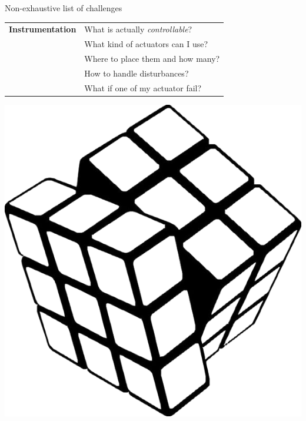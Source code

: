 \documentclass[aspectratio=169,compress,12pt,dvipsnames]{beamer}
\begin{document}
\begin{frame}[t, c]{Non-exhaustive list of challenges}
    \vfill
    \begin{minipage}{.68\textwidth}
        \centering
        \begin{tabular}{rl}
            \textbf{Instrumentation}    &   What is actually \emph{controllable}?   \\
                                        &   What kind of actuators can I use?       \\
                                        &   Where to place them and how many?       \\
                                        &   How to handle disturbances?             \\
                                        &   What if one of my actuator fail?
        \end{tabular}
    \end{minipage}%
    \hfill
    \begin{minipage}{.28\textwidth}
        \centering
        \includegraphics[width=\textwidth]{rubik_cube.png}
    \end{minipage}
    \vfill
\end{frame}
\end{document}
